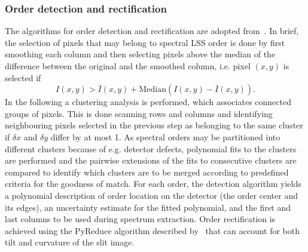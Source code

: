 \subsubsection{Order detection and rectification}\label{ssec:orderhandling}
The algorithms for order detection and rectification are adopted from~\cite{pis02,pis21}.
In brief, the selection of pixels that may belong to spectral \ac{LSS} order is done by first smoothing each column and then selecting pixels above the median of the difference between the original
and the smoothed column, i.e. pixel $(x,y)$ is selected if
\begin{equation}
    I(x,y) > \bar{I}(x,y) + \mathrm{Median} ( I(x,y) - \bar{I}(x,y) ) .
\end{equation}
In the following a clustering analysis is performed, which associates connected groups of pixels. This is done scanning rows and columns and identifying neighbouring pixels selected in the previous step as belonging to the same cluster if $\delta x$ and $\delta y$ differ by at most 1. As spectral orders may be partitioned into different clusters because of e.g. detector defects, polynomial fits to the clusters are performed and the pairwise extensions of the fits to consecutive clusters are compared to identify which clusters are to be merged according to predefined criteria for the goodness of match. For each order, the detection algorithm yields a polynomial description of order location on the detector (the order center and its edges), an uncertainty estimate
for the fitted polynomial, and the first and last columns to be used during spectrum extraction. 
Order rectification is achieved using the PyReduce algorithm described by~\cite{pis21} that can account for both tilt and curvature of the slit image.   

